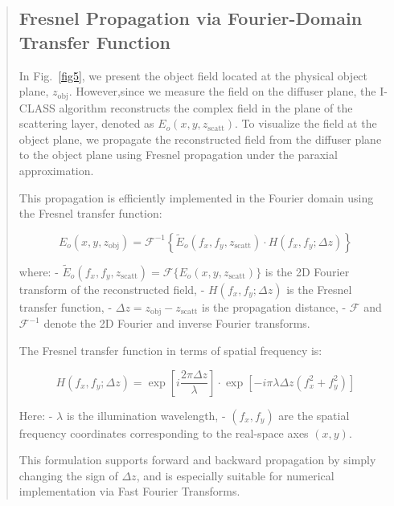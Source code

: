 \documentclass[12pt]{article}
\newenvironment{ourresponse}
    {\begin{tcolorbox}[width=\linewidth,breakable,enhanced,colback=gray!5,colframe=responsecolor!50,title=Response,left=5pt,right=5pt]}
    {\end{tcolorbox}}
\begin{document}
\begin{enumerate}[label=\arabic*.]
\begin{ourresponse}
\begin{quote}
            \subsection*{Fresnel Propagation via Fourier-Domain Transfer Function}
            \label{Fresnel_propagation}
            In Fig.~\ref{fig5}, we present the object field located at the physical object plane, $z_{\text{obj}}$. However,since we measure the field on the diffuser plane, the I-CLASS algorithm reconstructs the complex field in the plane of the scattering layer, denoted as $E_o(x, y, z_{\text{scatt}})$. To visualize the field at the object plane, we propagate the reconstructed field from the diffuser plane to the object plane using Fresnel propagation under the paraxial approximation.
            
            This propagation is efficiently implemented in the Fourier domain using the Fresnel transfer function:
            
            \begin{equation}
                E_o(x, y, z_{\text{obj}}) = \mathcal{F}^{-1} \left\{ \tilde{E}_o(f_x, f_y, z_{\text{scatt}}) \cdot H(f_x, f_y; \Delta z) \right\}
            \end{equation}
            
            where:
            - $ \tilde{E}_o(f_x, f_y, z_{\text{scatt}}) = \mathcal{F}\{ E_o(x, y, z_{\text{scatt}}) \} $ is the 2D Fourier transform of the reconstructed field,
            - $ H(f_x, f_y; \Delta z) $ is the Fresnel transfer function,
            - $ \Delta z = z_{\text{obj}} - z_{\text{scatt}} $ is the propagation distance,
            - $ \mathcal{F} $ and $ \mathcal{F}^{-1} $ denote the 2D Fourier and inverse Fourier transforms.
            
            The Fresnel transfer function in terms of spatial frequency is:
            
            \begin{equation}
                H(f_x, f_y; \Delta z) = \exp\left[ i \frac{2\pi \Delta z}{\lambda} \right] \cdot \exp\left[ -i \pi \lambda \Delta z (f_x^2 + f_y^2) \right]
            \end{equation}
            
            Here:
            - $ \lambda $ is the illumination wavelength,
            - $ (f_x, f_y) $ are the spatial frequency coordinates corresponding to the real-space axes $ (x, y) $.
            
            This formulation supports forward and backward propagation by simply changing the sign of $ \Delta z $, and is especially suitable for numerical implementation via Fast Fourier Transforms.
            

\end{quote}
\end{ourresponse}
\end{enumerate}
\end{document}
